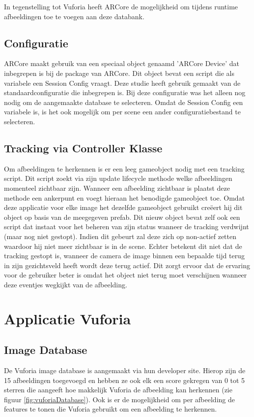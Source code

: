 In tegenstelling tot Vuforia heeft ARCore de mogelijkheid om tijdens runtime afbeeldingen toe te voegen aan deze databank.

\subsection{Configuratie}
ARCore maakt gebruik van een speciaal object genaamd 'ARCore Device' dat inbegrepen is bij de package van ARCore. Dit object bevat een script die als variabele een Session Config vraagt. Deze studie heeft gebruik gemaakt van de standaardconfiguratie die inbegrepen is. Bij deze configuratie was het alleen nog nodig om de aangemaakte database te selecteren.
Omdat de Session Config een variabele is, is het ook mogelijk om per scene een ander configuratiebestand te selecteren.

\subsection{Tracking via Controller Klasse}
Om afbeeldingen te herkennen is er een leeg gameobject nodig met een tracking script. Dit script zoekt via zijn update lifecycle methode welke afbeeldingen momenteel zichtbaar zijn. Wanneer een afbeelding zichtbaar is plaatst deze methode een ankerpunt en voegt hieraan het benodigde gameobject toe. Omdat deze applicatie voor elke image het dezelfde gameobject gebruikt creëert hij dit object op basis van de meegegeven prefab. Dit nieuw object bevat zelf ook een script dat instaat voor het beheren van zijn status wanneer de tracking verdwijnt (maar nog niet gestopt). Indien dit gebeurt zal deze zich op non-actief zetten waardoor hij niet meer zichtbaar is in de scene. Echter betekent dit niet dat de tracking gestopt is, wanneer de camera de image binnen een bepaalde tijd terug in zijn gezichtsveld heeft wordt deze terug actief. Dit zorgt ervoor dat de ervaring voor de gebruiker beter is omdat het object niet terug moet verschijnen wanneer deze eventjes wegkijkt van de afbeelding.

\section{Applicatie Vuforia}

\subsection{Image Database}
De Vuforia image database is aangemaakt via hun developer site. Hierop zijn de 15 afbeeldingen toegevoegd en hebben ze ook elk een score gekregen van 0 tot 5 sterren die aangeeft hoe makkelijk Vuforia de afbeelding kan herkennen (zie figuur \ref{fig:vuforiaDatabase}). Ook is er de mogelijkheid om per afbeelding de features te tonen die Vuforia gebruikt om een afbeelding te herkennen.

